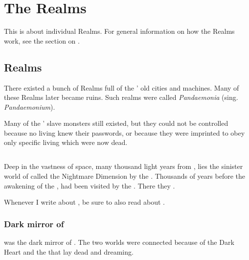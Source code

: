 \chapter{The Realms}
This is about individual Realms. 
For general information on how the Realms work, see the section on . 















\section{\Draconian Realms}
There existed a bunch of Realms full of the \dragons' old cities and machines. 
Many of these Realms later became \wylde ruins. 
Such realms were called \emph{Pandaemonia} (sing. \emph{Pandaemonium}). 

Many of the \dragons' slave monsters still existed, but they could not be controlled because no living \dragons knew their passwords, or because they were imprinted to obey only specific living \dragons which were now dead. 















\section{\Erebos}
\index{\Erebos}
Deep in the vastness of space, many thousand light years from \Miith{}, lies the sinister world of \Erebos{}\dash called the Nightmare Dimension by the \caisith. 
Thousands of years before the awakening of the \dragons{}, \Erebos{} had been visited by the \voyagers{}. 
There they . 

Whenever I write about \Erebos, be sure to also read about .









\subsection{Dark mirror of \Nyx}
\Erebos was the dark mirror of \Nyx. 
The two worlds were connected because of the Dark Heart and the  that lay dead and dreaming.









